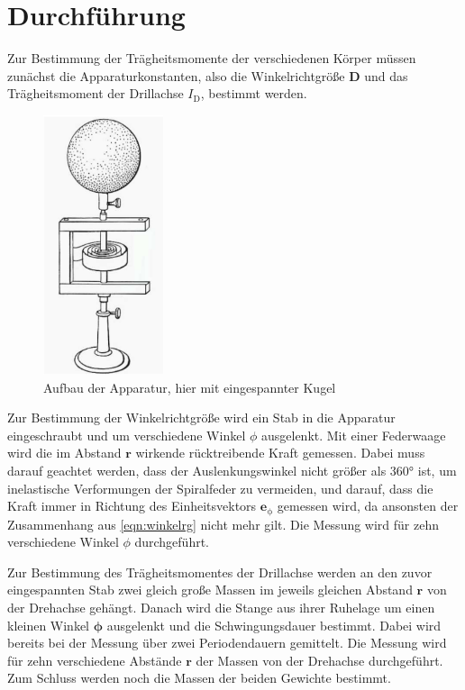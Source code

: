 \section{Durchführung}
\label{sec:Durchführung}

Zur Bestimmung der Trägheitsmomente der verschiedenen Körper müssen zunächst die
Apparaturkonstanten, also die Winkelrichtgröße $\symbf{D}$ und das Trägheitsmoment
der Drillachse $I_\mathrm{D}$, bestimmt werden.
\begin{figure}
  \centering
  \includegraphics[width=100pt]{Aufbau.png}
  \caption{Aufbau der Apparatur, hier mit eingespannter Kugel \cite{Versuchsanleitung}}
  \label{fig:Aufbau}
\end{figure}


Zur Bestimmung der Winkelrichtgröße wird ein Stab in die Apparatur eingeschraubt und
um verschiedene Winkel $\phi$ ausgelenkt. Mit einer Federwaage wird die im Abstand
$\symbf{r}$ wirkende rücktreibende Kraft gemessen. Dabei muss darauf geachtet werden,
dass der Auslenkungswinkel nicht größer als 360° ist, um inelastische Verformungen der
Spiralfeder zu vermeiden, und darauf, dass die Kraft immer in Richtung des Einheitsvektors
$\symbf{e}_\mathrm{{\phi}}$ gemessen wird, da ansonsten der Zusammenhang aus \eqref{eqn:winkelrg}
nicht mehr gilt. Die Messung wird für zehn verschiedene Winkel $\phi$ durchgeführt.

Zur Bestimmung des Trägheitsmomentes der Drillachse werden an den zuvor eingespannten
Stab zwei gleich große Massen im jeweils gleichen Abstand $\symbf{r}$ von der
Drehachse gehängt. Danach wird die Stange aus ihrer Ruhelage um einen kleinen Winkel
$\symbf{\phi}$ ausgelenkt und die Schwingungsdauer bestimmt. Dabei wird bereits bei
der Messung über zwei Periodendauern gemittelt. Die Messung wird für zehn verschiedene
Abstände $\symbf{r}$ der Massen von der Drehachse durchgeführt. Zum Schluss werden
noch die Massen der beiden Gewichte bestimmt.

